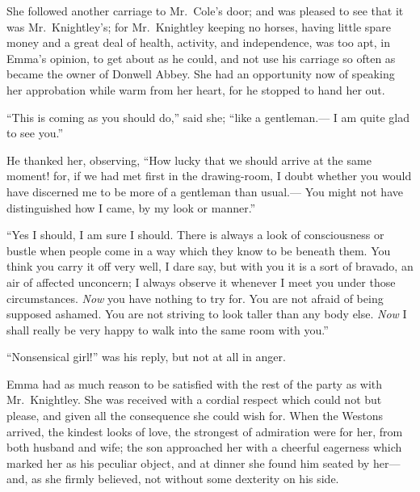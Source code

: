 She followed another carriage to Mr.\ Cole's door; and was pleased
to see that it was Mr.\ Knightley's; for Mr.\ Knightley keeping
no horses, having little spare money and a great deal of health,
activity, and independence, was too apt, in Emma's opinion, to get
about as he could, and not use his carriage so often as became
the owner of Donwell Abbey.  She had an opportunity now of speaking
her approbation while warm from her heart, for he stopped to hand her out.

``This is coming as you should do,'' said she; ``like a gentleman.---%
I am quite glad to see you.''

He thanked her, observing, ``How lucky that we should arrive at the same
moment! for, if we had met first in the drawing-room, I doubt whether
you would have discerned me to be more of a gentleman than usual.---%
You might not have distinguished how I came, by my look or manner.''

``Yes I should, I am sure I should.  There is always a look of
consciousness or bustle when people come in a way which they know
to be beneath them.  You think you carry it off very well, I dare say,
but with you it is a sort of bravado, an air of affected unconcern;
I always observe it whenever I meet you under those circumstances.
\emph{Now} you have nothing to try for.  You are not afraid of being
supposed ashamed.  You are not striving to look taller than any
body else.  \emph{Now} I shall really be very happy to walk into the same
room with you.''

``Nonsensical girl!'' was his reply, but not at all in anger.

Emma had as much reason to be satisfied with the rest of the party
as with Mr.\ Knightley.  She was received with a cordial respect
which could not but please, and given all the consequence she could
wish for.  When the Westons arrived, the kindest looks of love,
the strongest of admiration were for her, from both husband and wife;
the son approached her with a cheerful eagerness which marked
her as his peculiar object, and at dinner she found him seated
by her---and, as she firmly believed, not without some dexterity
on his side.

